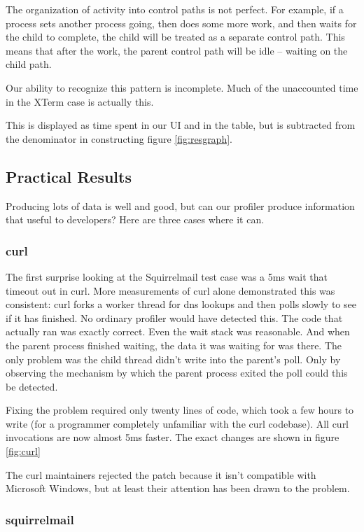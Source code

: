 \documentclass[10pt]{article}
\begin{document}
The organization of activity into control paths is not perfect.  For example, if a process sets another process going, then does some more work, and then waits for the child to complete, the child will be treated as a separate control path.  This means that after the work, the parent control path will be idle -- waiting on the child path.

Our ability to recognize this pattern is incomplete.  Much of the unaccounted time in the XTerm case is actually this.

This is displayed as time spent in our UI and in the table, but is subtracted from the denominator in constructing figure \ref{fig:resgraph}.

\subsection{Practical Results}

Producing lots of data is well and good, but can our profiler produce information that useful to developers?  Here are three cases where it can.

\subsubsection{curl}

The first surprise looking at the Squirrelmail test case was a 5ms wait that timeout out in curl.  More measurements of curl alone demonstrated this was consistent: curl forks a worker thread for dns lookups and then polls slowly to see if it has finished.  No ordinary profiler would have detected this.  The code that actually ran was exactly correct.  Even the wait stack was reasonable.  And when the parent process finished waiting, the data it was waiting for was there.  The only problem was the child thread didn't write into the parent's poll.  Only by observing the mechanism by which the parent process exited the poll could this be detected.

Fixing the problem required only twenty lines of code, which took a few hours to write (for a programmer completely unfamiliar with the curl codebase).  All curl invocations are now almost 5ms faster.  The exact changes are shown in figure \ref{fig:curl}

The curl maintainers rejected the patch because it isn't compatible with Microsoft Windows, but at least their attention has been drawn to the problem.

\subsubsection{squirrelmail}
\end{document}
